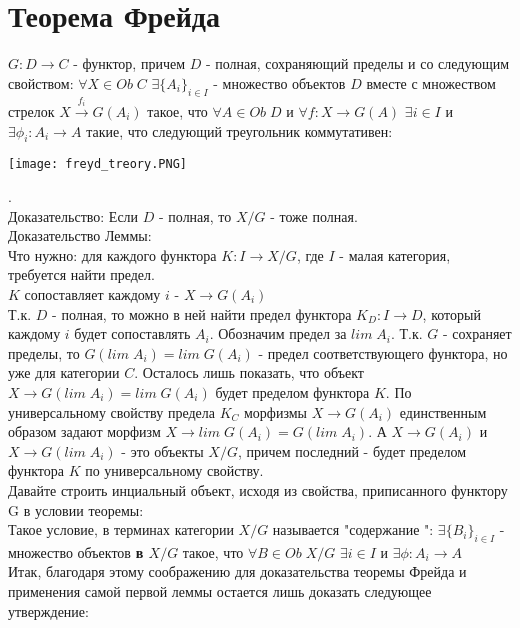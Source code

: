 \documentclass[a4paper]{article}
\theoremstyle{indented}
\theoremstyle{definition}
\theoremstyle{remark}
\DeclareMathOperator{\ra}{\rightarrow}
\begin{document}
\section{Теорема Фрейда}
\theorem $G: D \ra C$ - функтор, причем $D$ - полная, сохраняющий пределы и со следующим свойством: $\forall X \in Ob\;C$ $\exists \{A_i\}_{i \in I}$ - множество объектов $D$ вместе с множеством стрелок $X \stackrel{f_i}{\ra} G(A_i)$ такое, что $\forall A \in Ob\;D$ и $\forall f: X \ra G(A)$ $\exists i \in I$ и $\exists \phi_i: A_i \ra A$ такие, что следующий треугольник коммутативен:\\
\begin{center}\texttt{[image: freyd\_treory.PNG]}\end{center}
.\\
Доказательство:
\lemma Если $D$ - полная, то $X / G$ - тоже полная.\\
Доказательство Леммы: \\
Что нужно: для каждого функтора $K: I \ra X /G$, где $I$ - малая категория, требуется найти предел. \\
$K$ сопоставляет каждому $i$ - $X \ra G(A_i)$ \\
Т.к. $D$ - полная, то можно в ней найти предел функтора $K_D: I \ra D$, который каждому $i$ будет сопоставлять $A_i$. Обозначим предел за $lim\;A_i$. Т.к. $G$ - сохраняет пределы, то $G(lim\;A_i) = lim\;G(A_i)$ - предел соответствующего функтора, но уже для категории $C$. Осталось лишь показать, что объект $X \ra G(lim\;A_i) = lim\;G(A_i)$ будет пределом функтора $K$. По универсальному свойству предела $K_C$ морфизмы $X \ra G(A_i)$ единственным образом задают морфизм $X \ra lim\;G(A_i) = G(lim\;A_i)$. А $X \ra G(A_i)$ и $X \ra G(lim\;A_i)$ - это объекты $X / G$, причем последний - будет пределом функтора $K$ по универсальному свойству. \\
Давайте строить инциальный объект, исходя из свойства, приписанного функтору G в условии теоремы:\\
Такое условие, в терминах категории $X / G$ называется "содержание ": $\exists \{B_i\}_{i \in I}$ - множество объектов \textbf{в $X / G$} такое, что $\forall B \in Ob\;X / G$ $\exists i \in I$ и $\exists \phi: A_i \ra A$ \\
Итак, благодаря этому соображению для доказательства теоремы Фрейда и применения самой первой леммы остается лишь доказать следующее утверждение: \\
\end{document}
